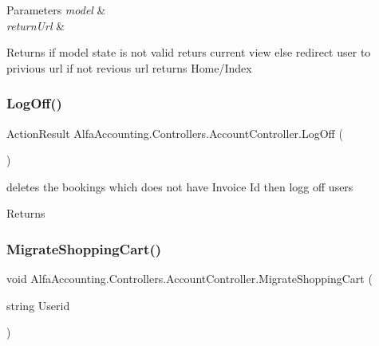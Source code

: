 \begin{DoxyParams}{Parameters}
{\em model} & \\
\hline
{\em return\+Url} & \\
\hline
\end{DoxyParams}
\begin{DoxyReturn}{Returns}
if model state is not valid returs current view else redirect user to privious url if not revious url returns Home/\+Index
\end{DoxyReturn}
\mbox{\label{class_alfa_accounting_1_1_controllers_1_1_account_controller_a528cb9ea0f972171ecad9424be46bcc1}} 
\subsubsection{\texorpdfstring{Log\+Off()}{LogOff()}}
{\footnotesize\ttfamily Action\+Result Alfa\+Accounting.\+Controllers.\+Account\+Controller.\+Log\+Off (\begin{DoxyParamCaption}{ }\end{DoxyParamCaption})}



deletes the bookings which does not have Invoice Id then logg off users 

\begin{DoxyReturn}{Returns}

\end{DoxyReturn}
\mbox{\label{class_alfa_accounting_1_1_controllers_1_1_account_controller_a87ae473251c220a1da2786b60780c8e7}} 
\subsubsection{\texorpdfstring{Migrate\+Shopping\+Cart()}{MigrateShoppingCart()}}
{\footnotesize\ttfamily void Alfa\+Accounting.\+Controllers.\+Account\+Controller.\+Migrate\+Shopping\+Cart (\begin{DoxyParamCaption}\item[{string}]{Userid }\end{DoxyParamCaption})\hspace{0.3cm}{\ttfamily [private]}}



